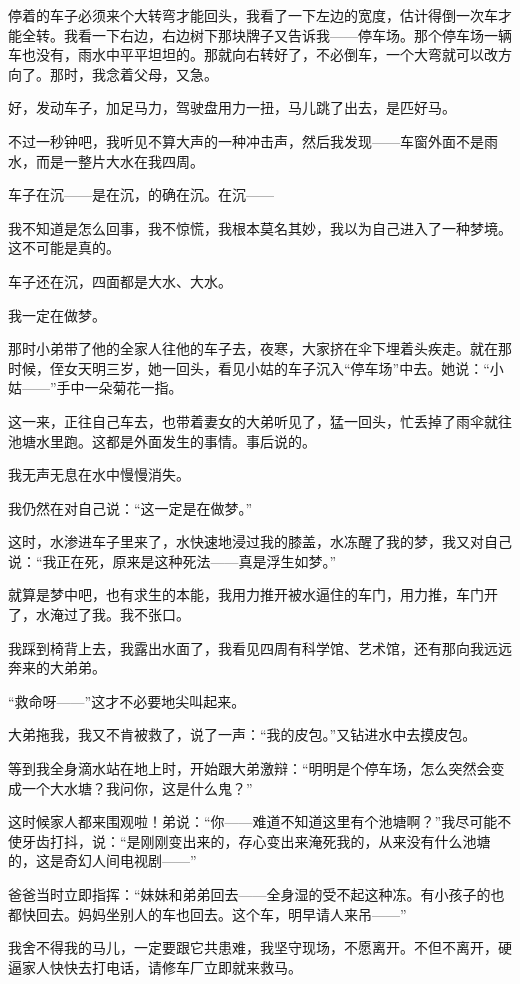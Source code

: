 \par 停着的车子必须来个大转弯才能回头，我看了一下左边的宽度，估计得倒一次车才能全转。我看一下右边，右边树下那块牌子又告诉我——停车场。那个停车场一辆车也没有，雨水中平平坦坦的。那就向右转好了，不必倒车，一个大弯就可以改方向了。那时，我念着父母，又急。
\par 好，发动车子，加足马力，驾驶盘用力一扭，马儿跳了出去，是匹好马。
\par 不过一秒钟吧，我听见不算大声的一种冲击声，然后我发现——车窗外面不是雨水，而是一整片大水在我四周。
\par 车子在沉——是在沉，的确在沉。在沉——
\par 我不知道是怎么回事，我不惊慌，我根本莫名其妙，我以为自己进入了一种梦境。这不可能是真的。
\par 车子还在沉，四面都是大水、大水。
\par 我一定在做梦。
\par 那时小弟带了他的全家人往他的车子去，夜寒，大家挤在伞下埋着头疾走。就在那时候，侄女天明三岁，她一回头，看见小姑的车子沉入“停车场”中去。她说：“小姑——”手中一朵菊花一指。
\par 这一来，正往自己车去，也带着妻女的大弟听见了，猛一回头，忙丢掉了雨伞就往池塘水里跑。这都是外面发生的事情。事后说的。
\par 我无声无息在水中慢慢消失。
\par 我仍然在对自己说：“这一定是在做梦。”
\par 这时，水渗进车子里来了，水快速地浸过我的膝盖，水冻醒了我的梦，我又对自己说：“我正在死，原来是这种死法——真是浮生如梦。”
\par 就算是梦中吧，也有求生的本能，我用力推开被水逼住的车门，用力推，车门开了，水淹过了我。我不张口。
\par 我踩到椅背上去，我露出水面了，我看见四周有科学馆、艺术馆，还有那向我远远奔来的大弟弟。
\par “救命呀——”这才不必要地尖叫起来。
\par 大弟拖我，我又不肯被救了，说了一声：“我的皮包。”又钻进水中去摸皮包。
\par 等到我全身滴水站在地上时，开始跟大弟激辩：“明明是个停车场，怎么突然会变成一个大水塘？我问你，这是什么鬼？”
\par 这时候家人都来围观啦！弟说：“你——难道不知道这里有个池塘啊？”我尽可能不使牙齿打抖，说：“是刚刚变出来的，存心变出来淹死我的，从来没有什么池塘的，这是奇幻人间电视剧——”
\par 爸爸当时立即指挥：“妹妹和弟弟回去——全身湿的受不起这种冻。有小孩子的也都快回去。妈妈坐别人的车也回去。这个车，明早请人来吊——”
\par 我舍不得我的马儿，一定要跟它共患难，我坚守现场，不愿离开。不但不离开，硬逼家人快快去打电话，请修车厂立即就来救马。
